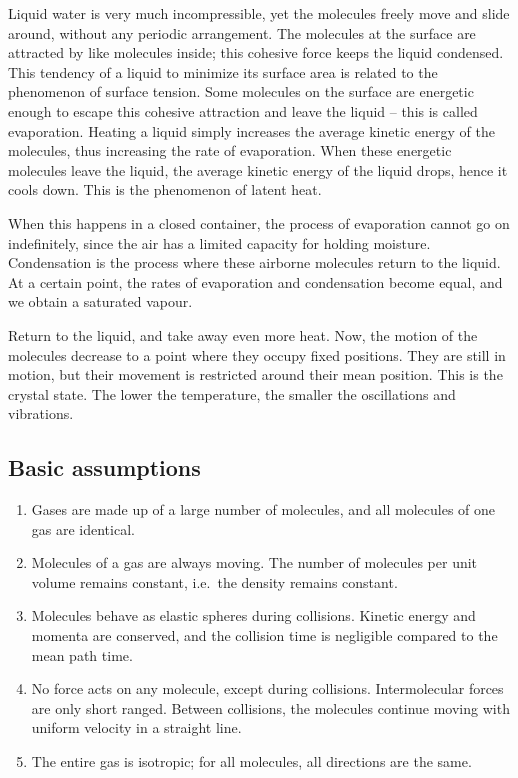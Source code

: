 \documentclass[11pt]{article}
\theoremstyle{definition}
\theoremstyle{remark}
\numberwithin{equation}{section}
\begin{document}
    Liquid water is very much incompressible, yet the molecules freely move and
    slide around, without any periodic arrangement. The molecules at the surface are
    attracted by like molecules inside; this cohesive force keeps the liquid 
    condensed. This tendency of a liquid to minimize its surface area is related to
    the phenomenon of surface tension. Some molecules on the surface are energetic
    enough to escape this cohesive attraction and leave the liquid -- this is called
    evaporation. Heating a liquid simply increases the average kinetic energy of the
    molecules, thus increasing the rate of evaporation.
    When these energetic molecules leave the liquid, the average kinetic energy of
    the liquid drops, hence it cools down. This is the phenomenon of latent heat.

    When this happens in a closed container, the process of evaporation cannot go on
    indefinitely, since the air has a limited capacity for holding moisture.
    Condensation is the process where these airborne molecules return to the liquid.
    At a certain point, the rates of evaporation and condensation become equal, and
    we obtain a saturated vapour.

    Return to the liquid, and take away even more heat. Now, the motion of the
    molecules decrease to a point where they occupy fixed positions. They are still
    in motion, but their movement is restricted around their mean position.
    This is the crystal state. The lower the temperature, the smaller the
    oscillations and vibrations.

    \subsection{Basic assumptions}
    \begin{enumerate}
        \itemsep0em 
        \item Gases are made up of a large number of molecules, and all molecules of
        one gas are identical.
        \item Molecules of a gas are always moving. The number of molecules per unit
        volume remains constant, i.e.\ the density remains constant.
        \item Molecules behave as elastic spheres during collisions. Kinetic energy
        and momenta are conserved, and the collision time is negligible compared to
        the mean path time.
        \item No force acts on any molecule, except during collisions.
        Intermolecular forces are only short ranged. Between collisions, the
        molecules continue moving with uniform velocity in a straight line.
        \item The entire gas is isotropic; for all molecules, all directions are the
        same.
    \end{enumerate}
    
\end{document}
